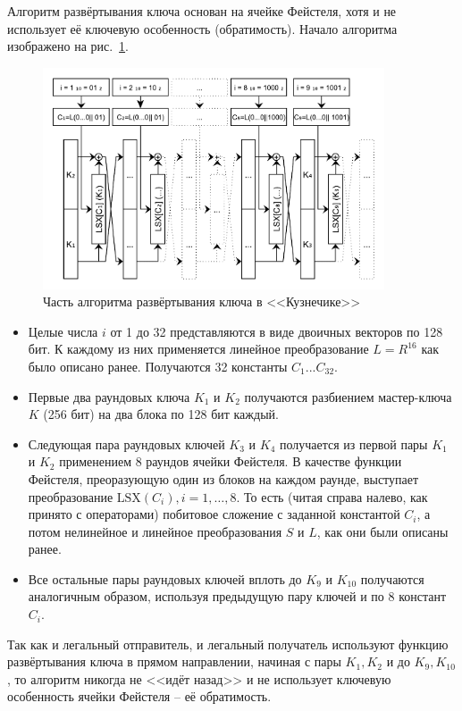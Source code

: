 Алгоритм развёртывания ключа основан на ячейке Фейстеля, хотя и не использует её ключевую особенность (обратимость). Начало алгоритма изображено на рис.~\ref{fig:kuznechik-keys}.

\begin{figure}[htb]
	\centering
	\includegraphics[width=0.90\textwidth]{pic/kuznechik-keys}
  \caption{Часть алгоритма развёртывания ключа в <<Кузнечике>>}
  \label{fig:kuznechik-keys}
\end{figure}

\begin{itemize}
	\item Целые числа $i$ от 1 до 32 представляются в виде двоичных векторов по 128 бит. К каждому из них применяется линейное преобразование $L=R^{16}$ как было описано ранее. Получаются 32 константы $C_{1}...C_{32}$.
	\item Первые два раундовых ключа $K_1$ и $K_2$ получаются разбиением мастер-ключа $K$ (256 бит) на два блока по 128 бит каждый.
	\item Следующая пара раундовых ключей $K_3$ и $K_4$ получается из первой пары $K_1$ и $K_2$ применением 8 раундов ячейки Фейстеля. В качестве функции Фейстеля, преоразующую один из блоков на каждом раунде, выступает преобразование $\text{LSX}(C_i), i=1,\dots,8$. То есть (читая справа налево, как принято с операторами) побитовое сложение с заданной константой $C_i$, а потом нелинейное и линейное преобразования $S$ и $L$, как они были описаны ранее.
	\item Все остальные пары раундовых ключей вплоть до $K_{9}$ и $K_{10}$ получаются аналогичным образом, используя предыдущую пару ключей и по 8 констант $C_i$.
\end{itemize}

Так как и легальный отправитель, и легальный получатель используют функцию развёртывания ключа в прямом направлении, начиная с пары $K_1, K_2$ и до $K_{9}, K_{10}$, то алгоритм никогда не <<идёт назад>> и не использует ключевую особенность ячейки Фейстеля -- её обратимость.

